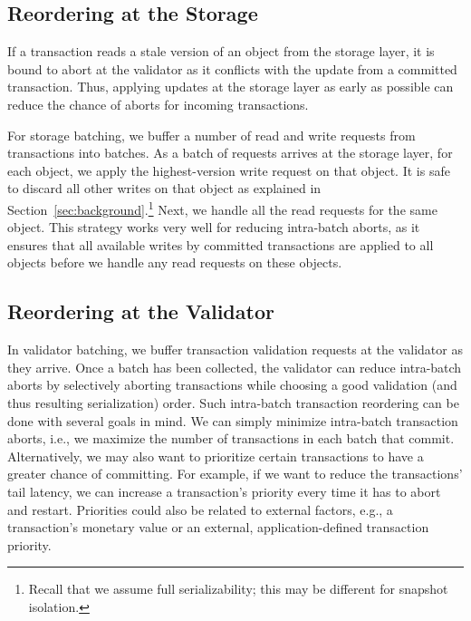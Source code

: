 \subsection{Reordering at the Storage}\label{subsec:storage_reordering}
If a transaction reads a stale version of an object from the storage layer, it is bound to 
abort at the validator as it conflicts with the update from a committed transaction. 
Thus, applying updates at the storage layer as early as possible can 
reduce the chance of aborts for incoming transactions.

 For storage batching, we buffer a number of read and write requests from transactions into batches. 
As a batch of requests arrives at the storage layer, for each object, we apply the highest-version write request on that object. It is safe to discard all other writes on that object as explained in Section~\ref{sec:background}.\footnote{Recall that we assume full serializability; this may be different for snapshot isolation.} 
Next, we handle all the read requests for the same object. This strategy works very well for reducing intra-batch aborts, 
as it ensures that all available writes by committed transactions are applied to all objects before we handle any read requests on these objects. 

\subsection{Reordering at the Validator}\label{subsec:validator_reordering}

In validator batching, we buffer transaction validation requests at the validator as they arrive. Once a batch has been collected, the validator can reduce intra-batch aborts by selectively aborting transactions while choosing a good validation (and thus resulting serialization) order.
Such intra-batch transaction reordering can be done with several goals in mind. We can simply minimize intra-batch transaction aborts, i.e., we maximize the number of transactions in each batch that commit. Alternatively, we may also want to prioritize certain transactions to have a greater chance of committing. For example, if we want to reduce the transactions' tail latency, we can increase a transaction's priority every time it has to abort and restart. Priorities could also be related to external factors, e.g., a transaction's monetary value or an external, application-defined transaction priority. 

